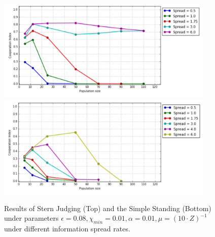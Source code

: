 \documentclass[10pt,a4paper]{article}
\begin{document}
\begin{figure}[h!]
\begin{center}
  \includegraphics[width=28em]{Images/comms_SJ.PNG}
  \includegraphics[width=28em]{Images/comms_SS.PNG}
\end{center}
  \caption{Results of Stern Judging (Top) and the Simple Standing (Bottom) under parameters $\epsilon = 0.08, \chi_{min} = 0.01, \alpha = 0.01, \mu = (10 \cdot Z)^{-1}$ under different information spread rates.}
  \label{fig:CommResults}
\end{figure}
\end{document}
